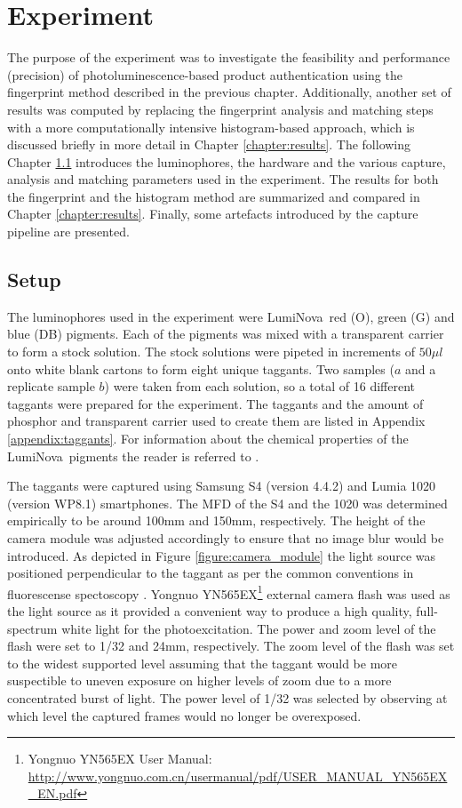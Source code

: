 \documentclass[thesis.tex]{subfiles}
\begin{document}
\chapter{Experiment}
\label{chapter:experiment}

The purpose of the experiment was to investigate the feasibility and performance (precision) of photoluminescence-based product authentication using the fingerprint method described in the previous chapter. Additionally, another set of results was computed by replacing the fingerprint analysis and matching steps with a more computationally intensive histogram-based approach, which is discussed briefly in more detail in Chapter \ref{chapter:results}. The following Chapter \ref{chapter:setup} introduces the luminophores, the hardware and the various capture, analysis and matching parameters used in the experiment. The results for both the fingerprint and the histogram method are summarized and compared in Chapter \ref{chapter:results}. Finally, some artefacts introduced by the capture pipeline are presented.

\section{Setup}
\label{chapter:setup}

The luminophores used in the experiment were LumiNova\textregistered\ red (O), green (G) and blue (DB) pigments. Each of the pigments was mixed with a transparent carrier to form a stock solution. The stock solutions were pipeted in increments of $50\mu l$ onto white blank cartons to form eight unique taggants. Two samples ($a$ and a replicate sample $b$) were taken from each solution, so a total of 16 different taggants were prepared for the experiment. The taggants and the amount of phosphor and transparent carrier used to create them are listed in Appendix \ref{appendix:taggants}. For information about the chemical properties of the LumiNova\textregistered\ pigments the reader is referred to \cite{luminova}.

The taggants were captured using Samsung S4 (version 4.4.2) and Lumia 1020 (version WP8.1) smartphones. The MFD of the S4 and the 1020 was determined empirically to be around 100mm and 150mm, respectively. The height of the camera module was adjusted accordingly to ensure that no image blur would be introduced. As depicted in Figure \ref{figure:camera_module} the light source was positioned perpendicular to the taggant as per the common conventions in fluorescense spectoscopy \cite{spectroscopy-principles}. Yongnuo YN565EX\footnote{Yongnuo YN565EX User Manual: \url{http://www.yongnuo.com.cn/usermanual/pdf/USER_MANUAL_YN565EX_EN.pdf}} external camera flash was used as the light source as it provided a convenient way to produce a high quality, full-spectrum white light for the photoexcitation. The power and zoom level of the flash were set to 1/32 and 24mm, respectively. The zoom level of the flash was set to the widest supported level assuming that the taggant would be more suspectible to uneven exposure on higher levels of zoom due to a more concentrated burst of light. The power level of 1/32 was selected by observing at which level the captured frames would no longer be overexposed.
\end{document}
